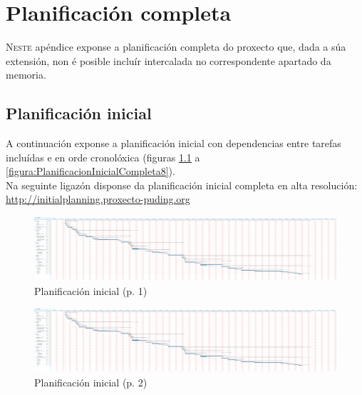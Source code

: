 \chapter{Planificación completa}
\label{chap:planificacion-completa}


\lettrine{N}{este} apéndice exponse a planificación completa do proxecto que,
dada a súa extensión, non é posible incluír intercalada no correspondente
apartado da memoria.

\section{Planificación inicial}

A continuación exponse a planificación inicial con dependencias entre tarefas
incluídas e en orde cronolóxica (figuras
\ref{figura:PlanificacionInicialCompleta1} a
\ref{figura:PlanificacionInicialCompleta8}). \\

Na seguinte ligazón disponse da planificación inicial completa en alta
resolución: \\

\url{http://initialplanning.proxecto-puding.org} \\

\begin{figure}
 \centering
 \includegraphics[trim=0 5cm 213cm 0,clip=true,scale=0.45,keepaspectratio=true]{./imagenes/planificacion-inicial.png}
 \caption{Planificación inicial (p. 1)}
 \label{figura:PlanificacionInicialCompleta1}
\end{figure}

\begin{figure}
 \centering
 \includegraphics[trim=29cm 5cm 181cm 0,clip=true,scale=0.45,keepaspectratio=true]{./imagenes/planificacion-inicial.png}
 \caption{Planificación inicial (p. 2)}
 \label{figura:PlanificacionInicialCompleta2}
\end{figure}

